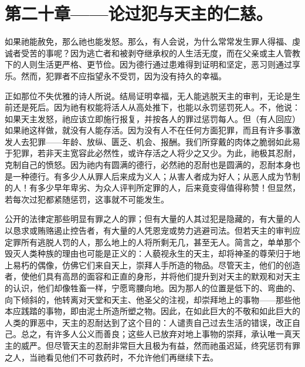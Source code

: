 
\section{第二十章——论过犯与天主的仁慈。}

如果祂能赦免，那么祂也能发怒。那么，有人会说，为什么常常发生罪人得福、虔诚者受苦的事呢？因为逃亡者和被剥夺继承权的人生活无度，而在父亲或主人管教下的人则生活更严格、更节俭。因为德行通过患难得到证明和坚定，恶习则通过享乐。然而，犯罪者不应指望永不受罚，因为没有持久的幸福。\par

\par

正如那位不失优雅的诗人所说。结局证明幸福，无人能逃脱天主的审判，无论是生前还是死后。因为祂有权能将活人从高处推下，也能以永罚惩罚死人。不，他说：如果天主发怒，祂应该立即施行报复，并按各人的罪过惩罚每人。但（有人回应）如果祂这样做，就没有人能存活。因为没有人不在任何方面犯罪，而且有许多事激发人去犯罪——年龄、放纵、匮乏、机会、报酬。我们所穿戴的肉体之脆弱如此易于犯罪，若非天主宽容此必然性，或许存活之人将少之又少。为此，祂极其忍耐，克制自己的愤怒。因为祂内有圆满的德行，必然祂的忍耐也是圆满的，忍耐本身也是一种德行。有多少人从罪人后来成为义人；从害人者成为好人；从恶人成为节制的人！有多少早年卑劣、为众人评判所定罪的人，后来竟变得值得称赞！但显然，若每次过犯都紧随惩罚，这事就不可能发生。\par

公开的法律定那些明显有罪之人的罪；但有大量的人其过犯是隐藏的，有大量的人以恳求或贿赂遏止控告者，有大量的人凭恩宠或势力逃避司法。但若天主的审判应定罪所有逃脱人罚的人，那么地上的人将所剩无几，甚至无人。简言之，单单那个毁灭人类种族的理由也可能是正义的：人藐视永生的天主，却将神圣的尊荣归于地上易朽的偶像，仿佛它们来自天上，崇拜人手所造的物品。尽管天主，他们的创造者，使他们具有高昂的面容和正直的身形，并将他们提升到对天主的默观和对天主的认识，他们却像牲畜一样，宁愿弯腰向地。因为那人的位置是低下的、弯曲的、向下倾斜的，他转离对天堂和天主、他圣父的注视，却崇拜地上的事物——那些他本应践踏的事物，即由泥土所造所塑之物。因此，在如此巨大的不敬和如此巨大的人类的罪恶中，天主的忍耐达到了这个目的：人谴责自己过去生活的错误，改正自己。总之，有许多人公义而善良；这些人已放弃对地上事物的崇拜，承认唯一真天主的威严。但尽管天主的忍耐非常巨大且极为有益，然而祂虽迟延，终究惩罚有罪之人，当祂看见他们不可救药时，不允许他们再继续下去。\par


